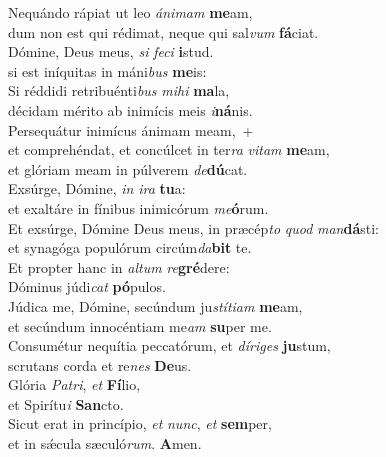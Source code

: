 \evenverse Nequándo rápiat ut leo \textit{á}\textit{ni}\textit{mam} \textbf{me}am,~\*\\
\evenverse dum non est qui rédimat, neque qui sal\textit{vum} \textbf{fá}ciat.\\
\oddverse Dómine, Deus meus, \textit{si} \textit{fe}\textit{ci} \textbf{i}stud.~\*\\
\oddverse si est iníquitas in máni\textit{bus} \textbf{me}is:\\
\evenverse Si réddidi retribuénti\textit{bus} \textit{mi}\textit{hi} \textbf{ma}la,~\*\\
\evenverse décidam mérito ab inimícis meis \textit{i}\textbf{ná}nis.\\
\oddverse Persequátur inimícus ánimam meam,~+\\
\oddverse  et comprehéndat, et concúlcet in ter\textit{ra} \textit{vi}\textit{tam} \textbf{me}am,~\*\\
\oddverse et glóriam meam in púlverem \textit{de}\textbf{dú}cat.\\
\evenverse Exsúrge, Dómine, \textit{in} \textit{i}\textit{ra} \textbf{tu}a:~\*\\
\evenverse et exaltáre in fínibus inimicórum \textit{me}\textbf{ó}rum.\\
\oddverse Et exsúrge, Dómine Deus meus, in præcép\textit{to} \textit{quod} \textit{man}\textbf{dá}sti:~\*\\
\oddverse et synagóga populórum circúm\textit{da}\textbf{bit} te.\\
\evenverse Et propter hanc in \textit{al}\textit{tum} \textit{re}\textbf{gré}dere:~\*\\
\evenverse Dóminus júdi\textit{cat} \textbf{pó}pulos.\\
\oddverse Júdica me, Dómine, secúndum ju\textit{stí}\textit{ti}\textit{am} \textbf{me}am,~\*\\
\oddverse et secúndum innocéntiam me\textit{am} \textbf{su}per me.\\
\evenverse Consumétur nequítia peccatórum, et \textit{dí}\textit{ri}\textit{ges} \textbf{ju}stum,~\*\\
\evenverse scrutans corda et re\textit{nes} \textbf{De}us.\\
\oddverse Glória \textit{Pa}\textit{tri}, \textit{et} \textbf{Fí}lio,~\*\\
\oddverse et Spirítu\textit{i} \textbf{San}cto.\\
\evenverse Sicut erat in princípio, \textit{et} \textit{nunc}, \textit{et} \textbf{sem}per,~\*\\
\evenverse et in sǽcula sæculó\textit{rum}. \textbf{A}men.\\
